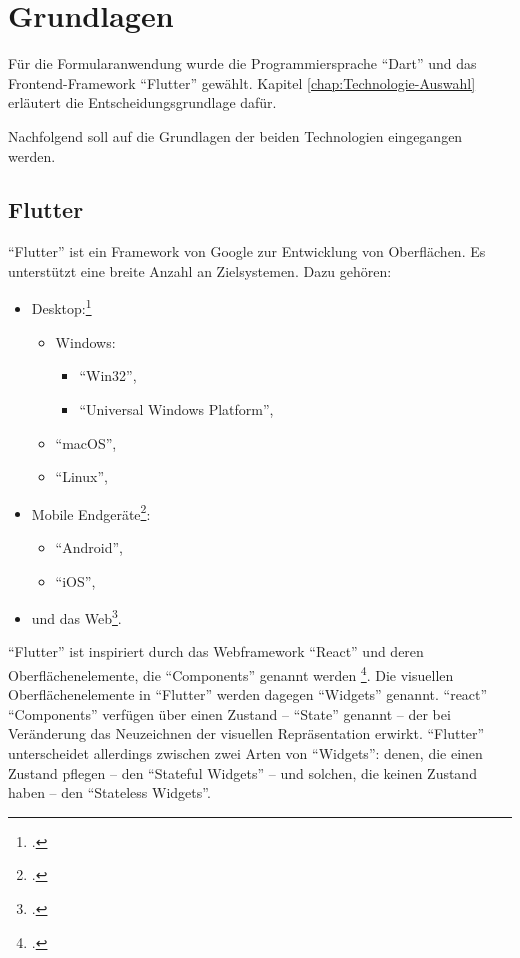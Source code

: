 \chapter{Grundlagen}
\label{chap:Grundlagen}

Für die Formularanwendung wurde die Programmiersprache \enquote{Dart} und das Frontend-Framework \enquote{Flutter} gewählt.
Kapitel \ref{chap:Technologie-Auswahl} erläutert die Entscheidungsgrundlage dafür.

Nachfolgend soll auf die Grundlagen der beiden Technologien eingegangen werden.

\section{Flutter}
\label{sec:Flutter-Grundlagen}

\enquote{Flutter} ist ein Framework von Google zur Entwicklung von Oberflächen.
Es unterstützt eine breite Anzahl an Zielsystemen.
 Dazu gehören:

\begin{itemize}[topsep=0pt,itemsep=-1ex,partopsep=1ex,parsep=1ex]
  \item Desktop:\footcite[Vgl.][]{DesktopSupportForFlutter}
        \begin{itemize}
          \item Windows:
                \begin{itemize}
                  \item \enquote{Win32},
                  \item \enquote{Universal Windows Platform},
                \end{itemize}
          \item \enquote{macOS},
          \item \enquote{Linux},
        \end{itemize}
  \item Mobile Endgeräte\footcite[Vgl.][]{FlutterBeautifulNativeAppsInRecordTime}:
        \begin{itemize}
          \item \enquote{Android},
          \item \enquote{iOS},
        \end{itemize}
  \item und das Web\footcite[Vgl.][]{WebSupportForFlutter}.
\end{itemize}

\enquote{Flutter} ist inspiriert durch das Webframework \enquote{React} und deren Oberflächenelemente, die \enquote{Components} genannt werden \footcite[Vgl.][]{IntroductionToWidgets}.
Die visuellen Oberflächenelemente in \enquote{Flutter} werden dagegen \enquote{Widgets} genannt.
\enquote{react} \enquote{Components} verfügen über einen Zustand -- \enquote{State} genannt -- der bei Veränderung das Neuzeichnen der visuellen Repräsentation erwirkt.
\enquote{Flutter} unterscheidet allerdings zwischen zwei Arten von \enquote{Widgets}: denen, die einen Zustand pflegen -- den \enquote{Stateful Widgets} -- und solchen, die keinen Zustand haben -- den \enquote{Stateless Widgets}.

